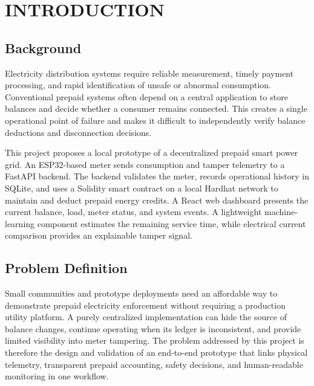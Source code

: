 \chapter{INTRODUCTION}
\section{Background}
Electricity distribution systems require reliable measurement, timely payment processing, and rapid identification of unsafe or abnormal consumption. Conventional prepaid systems often depend on a central application to store balances and decide whether a consumer remains connected. This creates a single operational point of failure and makes it difficult to independently verify balance deductions and disconnection decisions.

This project proposes a local prototype of a decentralized prepaid smart power grid. An ESP32-based meter sends consumption and tamper telemetry to a FastAPI backend. The backend validates the meter, records operational history in SQLite, and uses a Solidity smart contract on a local Hardhat network to maintain and deduct prepaid energy credits. A React web dashboard presents the current balance, load, meter status, and system events. A lightweight machine-learning component estimates the remaining service time, while electrical current comparison provides an explainable tamper signal.

\section{Problem Definition}
Small communities and prototype deployments need an affordable way to demonstrate prepaid electricity enforcement without requiring a production utility platform. A purely centralized implementation can hide the source of balance changes, continue operating when its ledger is inconsistent, and provide limited visibility into meter tampering. The problem addressed by this project is therefore the design and validation of an end-to-end prototype that links physical telemetry, transparent prepaid accounting, safety decisions, and human-readable monitoring in one workflow.

